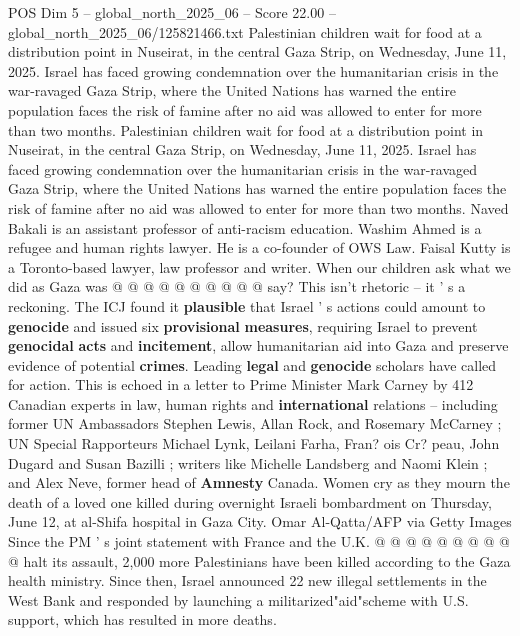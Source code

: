 \begin{textsample}{POS Dim 5 – global\_north\_2025\_06 – Score 22.00 – global\_north\_2025\_06/125821466.txt}  \label{ex:f5_pos_061}
Palestinian children wait for food at a distribution point in Nuseirat, in the central Gaza Strip, on Wednesday, June 11, 2025.
Israel has faced growing condemnation over the humanitarian crisis in the war-ravaged Gaza Strip, where the United Nations has warned the entire population faces the risk of famine after no aid was allowed to enter for more than two months.
Palestinian children wait for food at a distribution point in Nuseirat, in the central Gaza Strip, on Wednesday, June 11, 2025.
Israel has faced growing condemnation over the humanitarian crisis in the war-ravaged Gaza Strip, where the United Nations has warned the entire population faces the risk of famine after no aid was allowed to enter for more than two months.
Naved Bakali is an assistant professor of anti-racism education.
Washim Ahmed is a refugee and human rights lawyer.
He is a co-founder of OWS Law.
Faisal Kutty is a Toronto-based lawyer, law professor and writer.
When our children ask what we did as Gaza was @ @ @ @ @ @ @ @ @ @ say?
This isn't rhetoric -- it ' s a reckoning.
The ICJ found it \textbf{plausible} that Israel ' s actions could amount to \textbf{genocide} and issued six \textbf{provisional} \textbf{measures}, requiring Israel to prevent \textbf{genocidal} \textbf{acts} and \textbf{incitement}, allow humanitarian aid into Gaza and preserve evidence of potential \textbf{crimes}.
Leading \textbf{legal} and \textbf{genocide} scholars have called for action.
This is echoed in a letter to Prime Minister Mark Carney by 412 Canadian experts in law, human rights and \textbf{international} relations -- including former UN Ambassadors Stephen Lewis, Allan Rock, and Rosemary McCarney ; UN Special Rapporteurs Michael Lynk, Leilani Farha, Fran? ois Cr? peau, John Dugard and Susan Bazilli ; writers like Michelle Landsberg and Naomi Klein ; and Alex Neve, former head of \textbf{Amnesty} Canada.
Women cry as they mourn the death of a loved one killed during overnight Israeli bombardment on Thursday, June 12, at al-Shifa hospital in Gaza City.
Omar Al-Qatta/AFP via Getty Images Since the PM ' s joint statement with France and the U.K. @ @ @ @ @ @ @ @ @ @ halt its assault, 2,000 more Palestinians have been killed according to the Gaza health ministry.
Since then, Israel announced 22 new illegal settlements in the West Bank and responded by launching a militarized"aid"scheme with U.S. support, which has resulted in more deaths.

\end{textsample}
